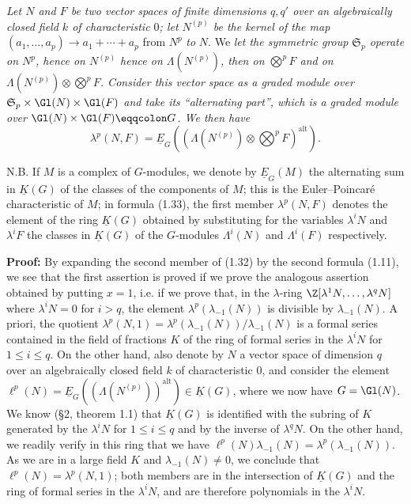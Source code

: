 \emph{Let $N$ and $F$ be two vector spaces of finite dimensions $q,q'$ over an algebraically closed field $k$ of characteristic $0$; let $N^{(p)}$ be the kernel of the map} $(a_1,\ldots,a_p)\longrightarrow a_1+\cdots+a_p$ from $N^p$ \emph{to} $N$.
We
%
\emph{let the symmetric group $\mathfrak S_p$ operate on $N^p$, hence on $N^{(p)}$ hence on $\Lambda(N^{(p)})$, then on $\bigotimes^p F$ and on $\Lambda(N^{(p)})\otimes\bigotimes^p F$. Consider this vector space as a graded module over $\mathfrak S_p\times\Gl(N)\times\Gl(F)$ and take its ``alternating part'', which is a graded module over $\Gl(N)\times\Gl(F)\eqqcolon G$. We then have}
\begin{equation}\tag{1.33}
\lambda^p(N,F)=\underline{E}_G\left(\left(\Lambda(N^{(p)})\otimes\bigotimes^p F\right)^{\mathrm{alt}}\right).
\end{equation}

N.B. If $M$ is a complex of $G$-modules, we denote by $\underline{E}_G(M)$ the alternating sum in $\underline{K}(G)$ of the classes of the components of $M$; this is the Euler--Poincaré characteristic of $M$; in formula (1.33), the first member $\lambda^p(N,F)$ denotes the element of the ring $\underline{K}(G)$ obtained by substituting for the variables $\lambda^iN$ and $\lambda^iF$ the classes in $\underline{K}(G)$ of the $G$-modules $\Lambda^i(N)$ and $\Lambda^i(F)$ respectively.

\textbf{Proof:} By expanding the second member of (1.32) by the second formula (1.11), we see that the first assertion is proved if we prove the analogous assertion obtained by putting $x=1$, i.e. if we prove that, in the $\lambda$-ring $\Z[\lambda^1N,\ldots,\lambda^qN]$ where $\lambda^iN=0$ for $i>q$, the element $\lambda^p(\lambda_{-1}(N))$ is divisible by $\lambda_{-1}(N)$. A priori, the quotient $\lambda^p(N,1)=\lambda^p(\lambda_{-1}(N))/\lambda_{-1}(N)$ is a formal series contained in the field of fractions $K$ of the ring of formal series in the $\lambda^iN$ for $1\leq i\leq q$. On the other hand, also denote by $N$ a vector space of dimension $q$ over an algebraically closed field $k$ of characteristic $0$, and consider the element $\ell^p(N)=\underline{E}_G((\Lambda(N^{(p)}))^{\mathrm{alt}})\in \underline{K}(G)$, where we now have $G=\Gl(N)$. We know (\S 2, theorem 1.1) that $\underline{K}(G)$ is identified
%
with the
subring of $K$ generated by the $\lambda^iN$ for $1\leq i\leq q$ and by the inverse of $\lambda^qN$. On the other hand, we readily verify in this ring that we have $\ell^p(N)\lambda_{-1}(N)=\lambda^p(\lambda_{-1}(N))$. As we are in a large field $K$ and $\lambda_{-1}(N)\neq0$, we conclude that $\ell^p(N)=\lambda^p(N,1)$; both members are in the intersection of $\underline{K}(G)$ and the ring of formal series in the $\lambda^iN$, and are therefore polynomials in the $\lambda^iN$.

